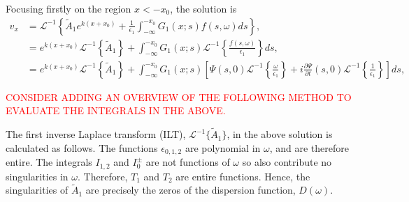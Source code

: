 \documentclass{aastex61}
\begin{document}
Focusing firstly on the region $x<-x_0$, the solution is
\newcommand{\e}{\epsilon}
\begin{align}
v_x &= \mathcal{L}^{-1} \left\{ \tilde{A}_1 e^{k(x+x_0)} + \frac{1}{\e_1} \int_{-\infty}^{-x_0} G_1(x;s)f(s, \omega)ds \right\}, \\
&= e^{k(x+x_0)} \mathcal{L}^{-1}\left\{ \tilde{A}_1 \right\} + \int_{-\infty}^{-x_0} G_1(x;s) \mathcal{L}^{-1}\left\{ \frac{f(s, \omega)}{\e_1} \right\} ds, \\
&= e^{k(x+x_0)} \mathcal{L}^{-1}\left\{ \tilde{A}_1 \right\} + \int_{-\infty}^{-x_0} G_1(x;s) \left[ \Psi (s, 0) \mathcal{L}^{-1}\left\{ \frac{\omega}{\e_1} \right\} + i \frac{\partial \Psi}{\partial t}(s, 0) \mathcal{L}^{-1}\left\{ \frac{1}{\e_1} \right\}\right] ds,
\label{sol incomp}
\end{align}

\textcolor{red}{CONSIDER ADDING AN OVERVIEW OF THE FOLLOWING METHOD TO EVALUATE THE INTEGRALS IN THE ABOVE.}

The first inverse Laplace transform (ILT), $\mathcal{L}^{-1}\{ \tilde{A}_1 \}$, in the above solution is calculated as follows. The functions $\epsilon_{0,1,2}$ are polynomial in $\omega$, and are therefore entire. The integrals $I_{1,2}$ and $I_0^\pm$ are not functions of $\omega$ so also contribute no singularities in $\omega$. Therefore, $T_1$ and $T_2$ are entire functions. Hence, the singularities of $\tilde{A}_1$ are precisely the zeros of the dispersion function, $D(\omega)$.
\end{document}
